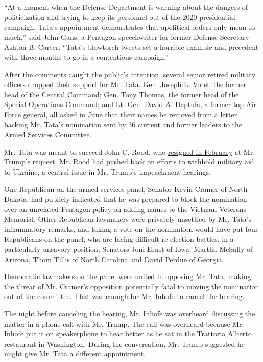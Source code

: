 ``At a moment when the Defense Department is warning about the dangers
of politicization and trying to keep its personnel out of the 2020
presidential campaign, Tata's appointment demonstrates that apolitical
orders only mean so much,'' said John Gans, a Pentagon speechwriter for
former Defense Secretary Ashton B. Carter. ``Tata's blowtorch tweets set
a horrible example and precedent with three months to go in a
contentious campaign.''

After the comments caught the public's attention, several senior retired
military officers dropped their support for Mr. Tata. Gen. Joseph L.
Votel, the former head of the Central Command; Gen. Tony Thomas, the
former head of the Special Operations Command; and Lt. Gen. David A.
Deptula, a former top Air Force general, all asked in June that their
names be removed from
\href{https://s.wsj.net/public/resources/documents/Tata-Letter_06-18-2020.pdf}{a
letter} backing Mr. Tata's nomination sent by 36 current and former
leaders to the Armed Services Committee.

Mr. Tata was meant to succeed John C. Rood, who
\href{https://www.nytimes3xbfgragh.onion/2020/02/19/us/politics/john-rood-trump.html}{resigned
in February} at Mr. Trump's request. Mr. Rood had pushed back on efforts
to withhold military aid to Ukraine, a central issue in Mr. Trump's
impeachment hearings.

One Republican on the armed services panel, Senator Kevin Cramer of
North Dakota, had publicly indicated that he was prepared to block the
nomination over an unrelated Pentagon policy on adding names to the
Vietnam Veterans Memorial. Other Republican lawmakers were privately
unsettled by Mr. Tata's inflammatory remarks, and taking a vote on the
nomination would have put four Republicans on the panel, who are facing
difficult re-election battles, in a particularly unsavory position:
Senators Joni Ernst of Iowa, Martha McSally of Arizona, Thom Tillis of
North Carolina and David Perdue of Georgia.

Democratic lawmakers on the panel were united in opposing Mr. Tata,
making the threat of Mr. Cramer's opposition potentially fatal to moving
the nomination out of the committee. That was enough for Mr. Inhofe to
cancel the hearing.

The night before canceling the hearing, Mr. Inhofe was overheard
discussing the matter in a phone call with Mr. Trump. The call was
overheard because Mr. Inhofe put it on speakerphone to hear better as he
sat in the Trattoria Alberto restaurant in Washington. During the
conversation, Mr. Trump suggested he might give Mr. Tata a different
appointment.

